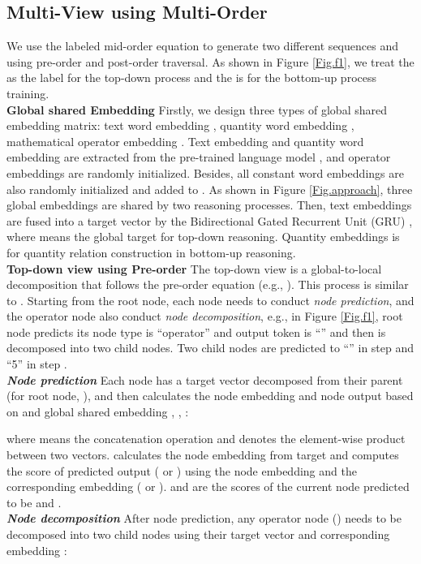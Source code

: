 \documentclass[11pt]{article}
\begin{document}
\subsection{Multi-View using Multi-Order}
\indent We use the labeled mid-order equation to generate two different sequences  and  using pre-order and post-order traversal. As shown in Figure \ref{Fig.f1}, we treat the  as the label for the top-down process and the  is for the bottom-up process training.\\
\indent \textbf{Global shared Embedding} Firstly, we design three types of global shared embedding matrix: text word embedding , quantity word embedding , mathematical operator embedding . Text embedding and quantity word embedding are extracted from the pre-trained language model \citep{devlin-etal-2019-bert, liu2019roberta}, and operator embeddings are randomly initialized. Besides, all constant word embeddings are also randomly initialized and added to . As shown in Figure \ref{Fig.approach}, three global embeddings are shared by two reasoning processes. Then, text embeddings  are fused into a target vector  by the Bidirectional Gated Recurrent Unit (GRU) \citep{cho2014learning}, where  means the global target for top-down reasoning. Quantity embeddings  is for quantity relation construction in bottom-up reasoning.\\
\indent \textbf{Top-down view using Pre-order} The top-down view is a global-to-local decomposition that follows the pre-order equation  (e.g., ). This process is similar to \citet{xie2019goal}. Starting from the root node, each node needs to conduct \emph{node prediction}, and the operator node also conduct \emph{node decomposition}, e.g., in Figure \ref{Fig.f1}, root node predicts its node type is ``operator'' and output token is ``'' and then is decomposed into two child nodes. Two child nodes are predicted to ``'' in step  and ``5'' in step .\\
\indent \emph{\textbf{Node prediction}} Each node has a target vector  decomposed from their parent (for root node, ), and then calculates the node embedding  and node output  based on  and global shared embedding , , :

where  means the concatenation operation and  denotes the element-wise product between two vectors.  calculates the node embedding from target and  computes the score of predicted output ( or ) using the node embedding and the corresponding embedding ( or ).  and  are the scores of the current node predicted to be  and .\\
\indent \emph{\textbf{Node decomposition}} After node prediction, any operator node () needs to be decomposed into two child nodes using their target vector  and corresponding embedding :
\end{document}
